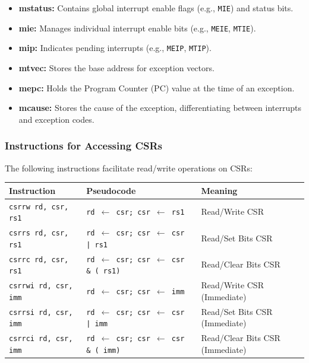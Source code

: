 \begin{itemize}
    \item \textbf{mstatus:} Contains global interrupt enable flags (e.g., \texttt{MIE}) and status bits.
    \item \textbf{mie:} Manages individual interrupt enable bits (e.g., \texttt{MEIE}, \texttt{MTIE}).
    \item \textbf{mip:} Indicates pending interrupts (e.g., \texttt{MEIP}, \texttt{MTIP}).
    \item \textbf{mtvec:} Stores the base address for exception vectors.
    \item \textbf{mepc:} Holds the Program Counter (PC) value at the time of an exception.
    \item \textbf{mcause:} Stores the cause of the exception, differentiating between interrupts and exception codes.
\end{itemize}

\subsubsection{Instructions for Accessing CSRs}
The following instructions facilitate read/write operations on CSRs:

\begin{center}
\begin{tabular}{|l|l|l|}
\hline
\textbf{Instruction} & \textbf{Pseudocode} & \textbf{Meaning} \\
\hline
\texttt{csrrw rd, csr, rs1} & \texttt{rd $\leftarrow$ csr; csr $\leftarrow$ rs1} & Read/Write CSR \\
\texttt{csrrs rd, csr, rs1} & \texttt{rd $\leftarrow$ csr; csr $\leftarrow$ csr | rs1} & Read/Set Bits CSR \\
\texttt{csrrc rd, csr, rs1} & \texttt{rd $\leftarrow$ csr; csr $\leftarrow$ csr \& (~rs1)} & Read/Clear Bits CSR \\
\texttt{csrrwi rd, csr, imm} & \texttt{rd $\leftarrow$ csr; csr $\leftarrow$ imm} & Read/Write CSR (Immediate) \\
\texttt{csrrsi rd, csr, imm} & \texttt{rd $\leftarrow$ csr; csr $\leftarrow$ csr | imm} & Read/Set Bits CSR (Immediate) \\
\texttt{csrrci rd, csr, imm} & \texttt{rd $\leftarrow$ csr; csr $\leftarrow$ csr \& (~imm)} & Read/Clear Bits CSR (Immediate) \\
\hline
\end{tabular}
\end{center}

